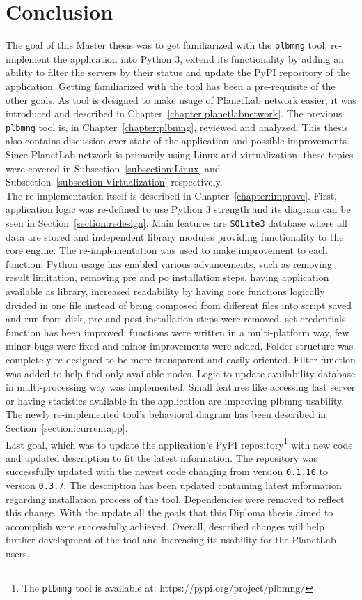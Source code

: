 \chapter{Conclusion}
The goal of this Master thesis was to get familiarized with the \texttt{plbmng} tool, re-implement the application into Python 3, extend its functionality by adding an ability to filter the servers by their status and update the PyPI repository of the application. Getting familiarized with the tool has been a pre-requisite of the other goals. As tool is designed to make usage of PlanetLab network easier, it was introduced and described in Chapter~\ref{chapter:planetlabnetwork}. The previous \texttt{plbmng} tool is, in Chapter~\ref{chapter:plbmng}, reviewed and analyzed. This thesis also contains discussion over state of the application and possible improvements. Since PlanetLab network is primarily using Linux and virtualization, these topics were covered in Subsection~\ref{subsection:Linux} and Subsection~\ref{subsection:Virtualization} respectively.\\
The re-implementation itself is described in Chapter~\ref{chapter:improve}. First, application logic was re-defined to use Python 3 strength and its diagram can be seen in Section~\ref{section:redesign}. Main features are \texttt{SQLite3} database where all data are stored and independent library modules providing functionality to the core engine. The re-implementation was used to make improvement to each function. Python usage has enabled various advancements, such as removing result limitation, removing pre and po installation steps, having application available as library, increased readability by having core functions logically divided in one file instead of being composed from different files into script saved and run from disk, pre and post installation steps were removed, set credentials function has been improved, functions were written in a multi-platform way, few minor bugs were fixed and minor improvements were added. Folder structure was completely re-designed to be more transparent and easily oriented. Filter function was added to help find only available nodes. Logic to update availability database in multi-processing way was implemented. Small features like accessing last server or having statistics available in the application are improving plbmng usability. The newly re-implemented tool's behavioral diagram has been described in Section~\ref{section:currentapp}.\\
Last goal, which was to update the application's PyPI repository\footnote{The \texttt{plbmng} tool is available at: https://pypi.org/project/plbmng/} with new code and updated description to fit the latest information. The repository was successfully updated with the newest code changing from version \texttt{0.1.10} to version \texttt{0.3.7}. The description has been updated containing latest information regarding installation process of the tool. Dependencies were removed to reflect this change. With the update all the goals that this Diploma thesis aimed to accomplish were successfully achieved. Overall, described changes will help further development of the tool and increasing its usability for the PlanetLab users.
